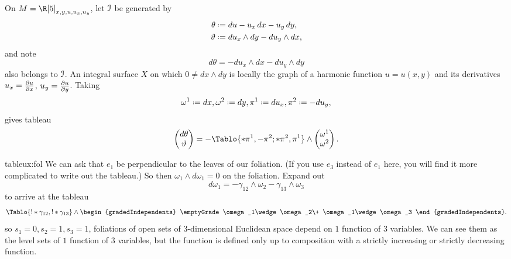 \begin{example}
On \(M=\R[5]_{x,y,u,u_x,u_y}\), let \(\mathcal{I}\) be generated by 
\begin{align*}
\theta & \defeq du-u_x \, dx - u_y \, dy, \\
\vartheta &\defeq du_x \wedge dy - du_y \wedge dx,
\end{align*}
and note
\[
d\theta = -du_x \wedge dx -du_y \wedge dy
\]
also belongs to \(\mathcal{I}\).
An integral surface \(X\) on which \(0 \ne dx \wedge dy\) is locally the graph of a harmonic function \(u=u(x,y)\) and its derivatives \(u_x = \pderiv{u}{x}\), \(u_y = \pderiv{u}{y}\).
Taking 
\[
\omega^1\defeq dx, \omega^2\defeq dy, \pi^1\defeq du_x, \pi^2\defeq -du_y,
\]
gives tableau
\[
\begin{pmatrix}
d\theta\\
\vartheta
\end{pmatrix}
=-\Tablo{*\pi^1,-\pi^2;*\pi^2,\pi^1}
\wedge
\begin{pmatrix}
\omega^1\\
\omega^2
\end{pmatrix}.
\]
\end{example}
\begin{answer}{tableux:fol}
We can ask that \(e_1\) be perpendicular to the leaves of our foliation.
(If you use \(e_3\) instead of \(e_1\) here, you will find it more complicated to write out the tableau.)
So then \(\omega_1\wedge d\omega_1=0\) on the foliation.
Expand out 
\[
d\omega_1=-\gamma_{12}\wedge\omega_2-\gamma_{13}\wedge\omega_3
\]
to arrive at the tableau
\[
\Tablo{!*\gamma_{12},!*\gamma_{13}}
\wedge
\begin{gradedIndependents}
\emptyGrade
\omega_1\wedge\omega_2\+
\omega_1\wedge\omega_3
\end{gradedIndependents}.
\]
so \(s_1=0,s_2=1,s_3=1\), foliations of open sets of \(3\)-dimensional Euclidean space depend on \(1\) function of \(3\) variables.
We can see them as the level sets of \(1\) function of \(3\) variables, but the function is defined only up to composition with a strictly increasing or strictly decreasing function.
\end{answer}


